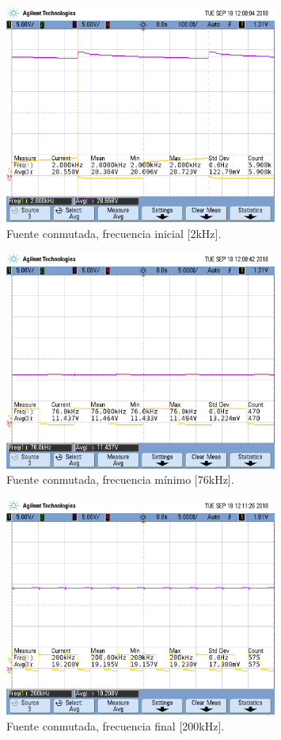 \begin{figure}[H]
	\centering
	\includegraphics[width=0.8\textwidth]{Imagenes/tp3_labo3.png}
\caption{Fuente conmutada, frecuencia inicial [2kHz].}
	\label{fig:fcon2}
\end{figure}

\begin{figure}[H]
	\centering
	\includegraphics[width=0.8\textwidth]{Imagenes/tp3_labo4.png}
\caption{Fuente conmutada, frecuencia mínimo [76kHz].}
	\label{fig:fcon76}
\end{figure}

\begin{figure}[H]
	\centering
	\includegraphics[width=0.8\textwidth]{Imagenes/tp3_labo5.png}
\caption{Fuente conmutada, frecuencia final [200kHz].}
	\label{fig:fcon200}
\end{figure}
 
